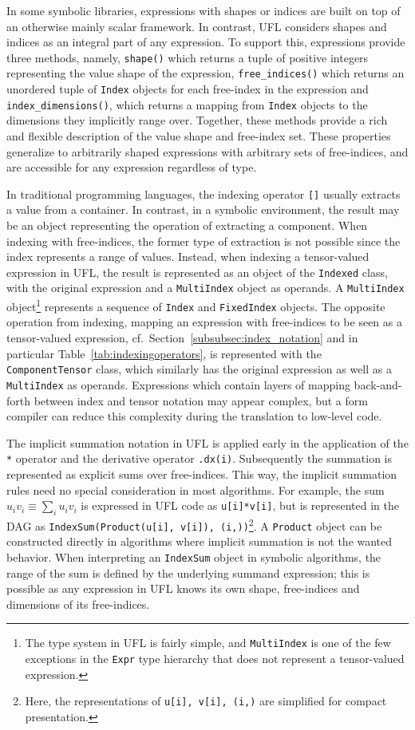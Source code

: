 \documentclass[prodmode,acmtoms]{acmsmall}
\newcommand{\uflc}[1]{\texttt{#1}}
\begin{document}
In some symbolic libraries, expressions with shapes or indices are
built on top of an otherwise mainly scalar framework. In contrast, UFL
considers shapes and indices as an integral part of any expression. To
support this, expressions provide three methods, namely,
\uflc{shape()} which returns a tuple of positive integers
representing the value shape of the expression,
\uflc{free\_indices()} which returns an unordered tuple of
\uflc{Index} objects for each free-index in the expression and
\uflc{index\_dimensions()}, which returns a mapping from
\uflc{Index} objects to the dimensions they implicitly range
over. Together, these methods provide a rich and flexible description
of the value shape and free-index set. These properties generalize to
arbitrarily shaped expressions with arbitrary sets of free-indices, and
are accessible for any expression regardless of type.

In traditional programming languages, the indexing operator \uflc{[]}
usually extracts a value from a container. In contrast, in a symbolic
environment, the result may be an object representing the operation of
extracting a component. When indexing with free-indices, the former
type of extraction is not possible since the index represents a range
of values. Instead, when indexing a tensor-valued expression in UFL,
the result is represented as an object of the \uflc{Indexed} class,
with the original expression and a \uflc{MultiIndex} object as
operands. A \uflc{MultiIndex} object\footnote{The type system in UFL
  is fairly simple, and \uflc{MultiIndex} is one of the few exceptions
  in the \uflc{Expr} type hierarchy that does not represent a
  tensor-valued expression.}  represents a sequence of \uflc{Index}
and \uflc{FixedIndex} objects. The opposite operation from indexing,
mapping an expression with free-indices to be seen as a tensor-valued
expression, cf.~Section~\ref{subsubsec:index_notation} and in
particular Table~\ref{tab:indexingoperators}, is represented with the
\uflc{ComponentTensor} class, which similarly has the original
expression as well as a \uflc{MultiIndex} as operands. Expressions
which contain layers of mapping back-and-forth between index and
tensor notation may appear complex, but a form compiler can reduce
this complexity during the translation to low-level code.

The implicit summation notation in UFL is applied early in the
application of the \uflc{*} operator and the derivative operator
\uflc{.dx(i)}. Subsequently the summation is represented as explicit
sums over free-indices. This way, the implicit summation rules need
no special consideration in most algorithms. For example, the sum $u_i
v_i \equiv \sum_i u_i v_i$ is expressed in UFL code as
\uflc{u[i]*v[i]}, but is represented in the DAG as
\uflc{IndexSum(Product(u[i], v[i]), (i,))}\footnote{Here, the
  representations of \uflc{u[i], v[i], (i,)} are simplified for
  compact presentation.}.  A \uflc{Product} object can be
constructed directly in algorithms where implicit summation is not the
wanted behavior. When interpreting an \uflc{IndexSum} object in
symbolic algorithms, the range of the sum is defined by the underlying
summand expression; this is possible as any expression in UFL knows
its own shape, free-indices and dimensions of its free-indices.
\end{document}
